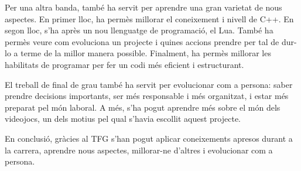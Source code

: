 \documentclass[a4paper]{article}
\begin{document}
Per una altra banda, també ha servit per aprendre una gran varietat de nous aspectes. En primer lloc, ha permès millorar el coneixement i nivell de C++. En segon lloc, s'ha après un nou llenguatge de programació, el Lua. També ha permès veure com evoluciona un projecte i quines accions prendre per tal de dur-lo a terme de la millor manera possible. Finalment, ha permès millorar les habilitats de programar per fer un codi més eficient i estructurant.

El treball de final de grau també ha servit per evolucionar com a persona: saber prendre decisions importants, ser més responsable i més organitzat, i estar més preparat pel món laboral. A més, s'ha pogut aprendre més sobre el món dels videojocs, un dels motius pel qual s'havia escollit aquest projecte.

En conclusió, gràcies al TFG s'han pogut aplicar coneixements apresos durant a la carrera, aprendre nous aspectes, millorar-ne d'altres i evolucionar com a persona.

\newpage
\nocite{*}
\printbibliography[heading=bibintoc]
\end{document}
